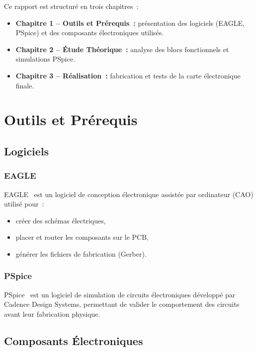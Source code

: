 \documentclass[a4paper,12pt,openany]{book}
\begin{document}
	\bigskip
	Ce rapport est structur\'e en trois chapitres~:
	\begin{itemize}
		\item \textbf{Chapitre 1 -- Outils et Pr\'erequis~:} pr\'esentation des
		logiciels (EAGLE, PSpice) et des composants \'electroniques utilis\'es.
		\item \textbf{Chapitre 2 -- \'Etude Th\'eorique~:} analyse des blocs
		fonctionnels et simulations PSpice.
		\item \textbf{Chapitre 3 -- R\'ealisation~:} fabrication et tests de la
		carte \'electronique finale.
	\end{itemize}
	
	\mainmatter
	
	\chapter{Outils et Pr\'erequis}
	
	\section{Logiciels}
	
	\subsection{EAGLE}
	
	EAGLE~\cite{EAGLE} est un logiciel de conception \'electronique assist\'ee
	par ordinateur (CAO) utilis\'e pour~:
	\begin{itemize}
		\item cr\'eer des sch\'emas \'electriques,
		\item placer et router les composants sur le PCB,
		\item g\'en\'erer les fichiers de fabrication (Gerber).
	\end{itemize}
	
	\subsection{PSpice}
	
	PSpice~\cite{PSPICE} est un logiciel de simulation de circuits
	\'electroniques d\'evelopp\'e par Cadence Design Systems, permettant de
	valider le comportement des circuits avant leur fabrication physique.
	
	\section{Composants \'Electroniques}
	
\end{document}
